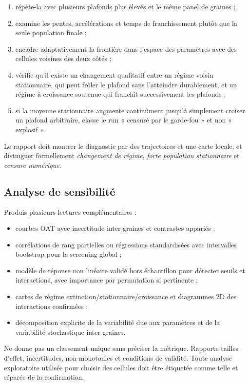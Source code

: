 \documentclass[11pt,a4paper]{article}
\begin{document}
\begin{enumerate}
  \item répète-la avec plusieurs plafonds plus élevés et le même panel de
    graines ;
  \item examine les pentes, accélérations et temps de franchissement plutôt que
    la seule population finale ;
  \item encadre adaptativement la frontière dans l'espace des paramètres avec
    des cellules voisines des deux côtés ;
  \item vérifie qu'il existe un changement qualitatif entre un régime voisin
    stationnaire, qui peut frôler le plafond sans l'atteindre durablement, et
    un régime à croissance soutenue qui franchit successivement les plafonds ;
  \item si la moyenne stationnaire augmente continûment jusqu'à simplement
    croiser un plafond arbitraire, classe le run « censuré par le garde-fou » et
    non « explosif ».
\end{enumerate}

Le rapport doit montrer le diagnostic par des trajectoires et une carte locale,
et distinguer formellement \emph{changement de régime}, \emph{forte population
stationnaire} et \emph{censure numérique}.

\subsection{Analyse de sensibilité}

Produis plusieurs lectures complémentaires :

\begin{itemize}
  \item courbes OAT avec incertitude inter-graines et contrastes appariés ;
  \item corrélations de rang partielles ou régressions standardisées avec
    intervalles bootstrap pour le screening global ;
  \item modèle de réponse non linéaire validé hors échantillon pour détecter
    seuils et interactions, avec importance par permutation si pertinente ;
  \item cartes de régime extinction/stationnaire/croissance et diagrammes 2D
    des interactions confirmées ;
  \item décomposition explicite de la variabilité due aux paramètres et de la
    variabilité stochastique inter-graines.
\end{itemize}

Ne donne pas un classement unique sans préciser la métrique. Rapporte tailles
d'effet, incertitudes, non-monotonies et conditions de validité. Toute analyse
exploratoire utilisée pour choisir des cellules doit être étiquetée comme telle
et séparée de la confirmation.
\end{document}

